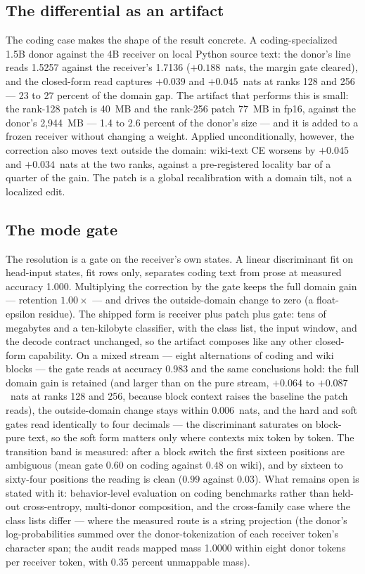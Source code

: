 \documentclass[11pt]{article}
\begin{document}
\subsection{The differential as an artifact}

The coding case makes the shape of the result concrete. A
coding-specialized 1.5B donor against the 4B receiver on local
Python source text: the donor's line reads 1.5257 against the
receiver's 1.7136 ($+0.188$~nats, the margin gate cleared), and
the closed-form read captures $+0.039$ and $+0.045$~nats at ranks
128 and 256 --- 23 to 27 percent of the domain gap. The artifact
that performs this is small: the rank-128 patch is 40~MB and the
rank-256 patch 77~MB in fp16, against the donor's 2{,}944~MB ---
1.4 to 2.6 percent of the donor's size --- and it is added to a
frozen receiver without changing a weight. Applied
unconditionally, however, the correction also moves text outside
the domain: wiki-text CE worsens by $+0.045$ and $+0.034$~nats at
the two ranks, against a pre-registered locality bar of a quarter
of the gain. The patch is a global recalibration with a domain
tilt, not a localized edit.

\subsection{The mode gate}

The resolution is a gate on the receiver's own states. A linear
discriminant fit on head-input states, fit rows only, separates
coding text from prose at measured accuracy 1.000. Multiplying
the correction by the gate keeps the full domain gain ---
retention $1.00\times$ --- and drives the outside-domain change
to zero (a float-epsilon residue). The shipped form is receiver
plus patch plus gate: tens of megabytes and a ten-kilobyte
classifier, with the class list, the input window, and the decode
contract unchanged, so the artifact composes like any other
closed-form capability. On a mixed stream --- eight alternations
of coding and wiki blocks --- the gate reads at accuracy 0.983
and the same conclusions hold: the full domain gain is retained
(and larger than on the pure stream, $+0.064$ to $+0.087$~nats at
ranks 128 and 256, because block context raises the baseline the
patch reads), the outside-domain change stays within
$0.006$~nats, and the hard and soft gates read identically to
four decimals --- the discriminant saturates on block-pure text,
so the soft form matters only where contexts mix token by token.
The transition band is measured: after a block switch the first
sixteen positions are ambiguous (mean gate $0.60$ on coding
against $0.48$ on wiki), and by sixteen to sixty-four positions
the reading is clean ($0.99$ against $0.03$). What remains open
is stated with it: behavior-level evaluation on coding
benchmarks rather than held-out cross-entropy, multi-donor
composition, and the cross-family case where the class lists
differ --- where the measured route is a string projection (the
donor's log-probabilities summed over the donor-tokenization of
each receiver token's character span; the audit reads mapped mass
1.0000 within eight donor tokens per receiver token, with 0.35
percent unmappable mass).
\end{document}
